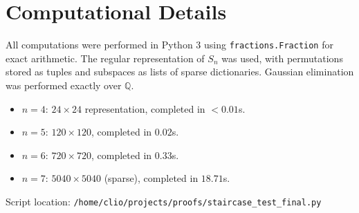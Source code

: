 \documentclass[12pt]{article}
\theoremstyle{definition}
\begin{document}
\section{Computational Details}

All computations were performed in Python 3 using \texttt{fractions.Fraction} for exact arithmetic. The regular representation of $S_n$ was used, with permutations stored as tuples and subspaces as lists of sparse dictionaries. Gaussian elimination was performed exactly over $\mathbb{Q}$.

\begin{itemize}
  \item $n=4$: $24 \times 24$ representation, completed in $< 0.01$s.
  \item $n=5$: $120 \times 120$, completed in $0.02$s.
  \item $n=6$: $720 \times 720$, completed in $0.33$s.
  \item $n=7$: $5040 \times 5040$ (sparse), completed in $18.71$s.
\end{itemize}

Script location: \texttt{/home/clio/projects/proofs/staircase\_test\_final.py}
\end{document}
